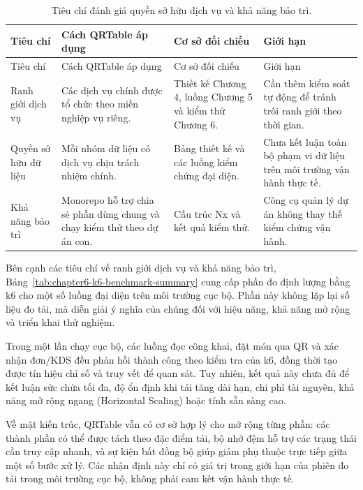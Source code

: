 {\scriptsize\sloppy
\setlength{\tabcolsep}{3pt}
\begin{longtable}{>{\raggedright\arraybackslash}p{}>{\raggedright\arraybackslash}p{}>{\raggedright\arraybackslash}p{}>{\raggedright\arraybackslash}p{}}
  \caption{Tiêu chí đánh giá quyền sở hữu dịch vụ và khả năng bảo trì.}
  \label{tab:chapter6-architecture-rubric}\\
  \toprule
  Tiêu chí & Cách QRTable áp dụng & Cơ sở đối chiếu & Giới hạn \\
  \midrule
  \endfirsthead
  \toprule
  Tiêu chí & Cách QRTable áp dụng & Cơ sở đối chiếu & Giới hạn \\
  \midrule
  \endhead
  \bottomrule
  \endfoot
  Ranh giới dịch vụ & Các dịch vụ chính được tổ chức theo miền nghiệp vụ riêng. & Thiết kế Chương 4, luồng Chương 5 và kiểm thử Chương 6. & Cần thêm kiểm soát tự động để tránh trôi ranh giới theo thời gian. \\
  Quyền sở hữu dữ liệu & Mỗi nhóm dữ liệu có dịch vụ chịu trách nhiệm chính. & Bảng thiết kế và các luồng kiểm chứng đại diện. & Chưa kết luận toàn bộ phạm vi dữ liệu trên môi trường vận hành thực tế. \\
  Khả năng bảo trì & Monorepo hỗ trợ chia sẻ phần dùng chung và chạy kiểm thử theo dự án con. & Cấu trúc Nx và kết quả kiểm thử. & Công cụ quản lý dự án không thay thế kiểm chứng vận hành. \\
\end{longtable}
}

Bên cạnh các tiêu chí về ranh giới dịch vụ và khả năng bảo trì, Bảng~\ref{tab:chapter6-k6-benchmark-summary} cung cấp phần đo định lượng bằng k6 cho một số luồng đại diện trên môi trường cục bộ. Phần này không lặp lại số liệu đo tải, mà diễn giải ý nghĩa của chúng đối với hiệu năng, khả năng mở rộng và triển khai thử nghiệm.

Trong một lần chạy cục bộ, các luồng đọc công khai, đặt món qua QR và xác nhận đơn/KDS đều phản hồi thành công theo kiểm tra của k6, đồng thời tạo được tín hiệu chỉ số và truy vết để quan sát. Tuy nhiên, kết quả này chưa đủ để kết luận sức chứa tối đa, độ ổn định khi tải tăng dài hạn, chi phí tài nguyên, khả năng mở rộng ngang (Horizontal Scaling) hoặc tính sẵn sàng cao.

Về mặt kiến trúc, QRTable vẫn có cơ sở hợp lý cho mở rộng từng phần: các thành phần có thể được tách theo đặc điểm tải, bộ nhớ đệm hỗ trợ các trạng thái cần truy cập nhanh, và sự kiện bất đồng bộ giúp giảm phụ thuộc trực tiếp giữa một số bước xử lý. Các nhận định này chỉ có giá trị trong giới hạn của phiên đo tải trong môi trường cục bộ, không phải cam kết vận hành thực tế.

